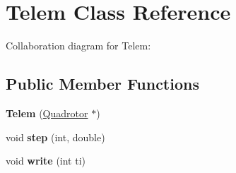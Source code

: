 \hypertarget{classTelem}{
\section{Telem Class Reference}
\label{classTelem}
}
Collaboration diagram for Telem:\subsection*{Public Member Functions}
\begin{DoxyCompactItemize}
\item 
\hypertarget{classTelem_adf4c51522fdb2c9e99e4169b0d628f55}{
{\bfseries Telem} (\hyperlink{classQuadrotor}{Quadrotor} $\ast$)}
\label{classTelem_adf4c51522fdb2c9e99e4169b0d628f55}

\item 
\hypertarget{classTelem_afaf5327d7f027c91734cbba4a8224569}{
void {\bfseries step} (int, double)}
\label{classTelem_afaf5327d7f027c91734cbba4a8224569}

\item 
\hypertarget{classTelem_a819ab752690e08d72ea26b8f5eda2995}{
void {\bfseries write} (int ti)}
\label{classTelem_a819ab752690e08d72ea26b8f5eda2995}

\end{DoxyCompactItemize}
